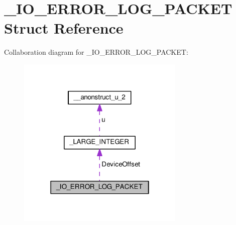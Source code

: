 \hypertarget{struct__IO__ERROR__LOG__PACKET}{}\section{\+\_\+\+I\+O\+\_\+\+E\+R\+R\+O\+R\+\_\+\+L\+O\+G\+\_\+\+P\+A\+C\+K\+E\+T Struct Reference}
\label{struct__IO__ERROR__LOG__PACKET}


Collaboration diagram for \+\_\+\+I\+O\+\_\+\+E\+R\+R\+O\+R\+\_\+\+L\+O\+G\+\_\+\+P\+A\+C\+K\+E\+T\+:
\nopagebreak
\begin{figure}[H]
\begin{center}
\leavevmode
\includegraphics[width=226pt]{struct__IO__ERROR__LOG__PACKET__coll__graph}
\end{center}
\end{figure}
